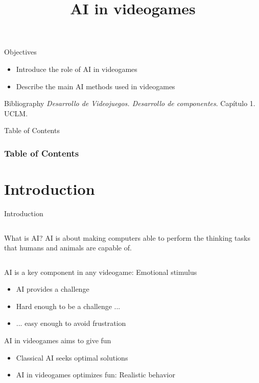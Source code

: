 \documentclass[10pt,compress]{beamer} %
\title[AI in videogames]{AI in videogames}
\author{}
\institute{\asignatura}
\date{}
\begin{document}
{\titlepageBlue
    \begin{frame}
        \titlepage
    \end{frame}
}

\begin{frame}[plain]{}
   \begin{block}{Objectives}
       \begin{itemize}
        \item Introduce the role of AI in videogames
        \item Describe the main AI methods used in videogames
       \end{itemize}
   \end{block}

   \begin{block}{Bibliography}
       \textit{Desarrollo de Videojuegos. Desarrollo de componentes}. Capítulo 1. UCLM.
   \end{block}
\end{frame}

{
\eliminarNavegacion
\begin{frame}[shrink]{Table of Contents}
 \frametitle{Table of Contents}
 \tableofcontents
\end{frame}
}

\section{Introduction}

\begin{frame}{Introduction}
    \begin{columns}
	\vspace{-0.5cm}
		\vspace{-0.5cm}
		\begin{block}{What is AI?}
		AI is about making computers able to perform the thinking tasks that humans and animals are capable of.\\
		\end{block}
	\end{columns}
		\vspace{0.25cm}
	AI is a key component in any videogame: \alert{Emotional stimulus}
	\begin{itemize}
		\item AI provides a challenge
		\item Hard enough to be a challenge ...
		\item ... easy enough to avoid frustration
  	\end{itemize}
	AI in videogames aims to give fun
	\begin{itemize}
		\item Classical AI seeks optimal solutions
		\item AI in videogames optimizes fun: Realistic behavior
  	\end{itemize}
\end{frame}
\end{document}
